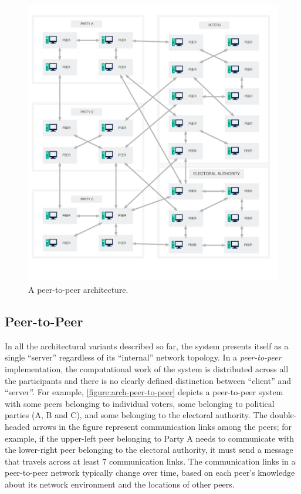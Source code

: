 \begin{figure}[t!]
\begin{center}
\includegraphics[width=6.5in]{architecture_resources/peer-to-peer.pdf}
\end{center}
\vspace*{-10ex}
\caption{A peer-to-peer architecture.}
\label{figure:arch-peer-to-peer}
\end{figure}

\subsection{Peer-to-Peer}

In all the architectural variants described so far, the system
presents itself as a single ``server'' regardless of its ``internal''
network topology. In a \emph{peer-to-peer} implementation, the
computational work of the system is distributed across all the
participants and there is no clearly defined distinction between
``client'' and ``server''. For example,
\autoref{figure:arch-peer-to-peer} depicts a peer-to-peer system with
some peers belonging to individual voters, some belonging to
political parties (A, B and C), and some belonging to the electoral
authority. The double-headed arrows in the figure represent
communication links among the peers; for example, if the upper-left
peer belonging to Party A needs to communicate with the lower-right
peer belonging to the electoral authority, it must send a message that
travels across at least 7 communication links. The communication links
in a peer-to-peer network typically change over time, based on each
peer's knowledge about its network environment and the locations of
other peers.

